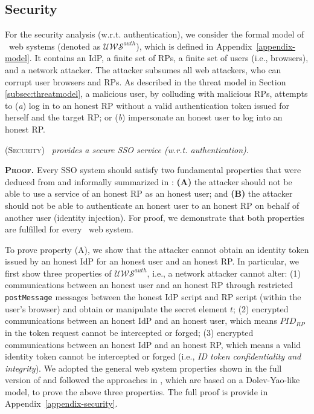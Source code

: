 \subsection{Security}
\label{analysis-security}

\newc
For the security analysis (w.r.t. authentication), we consider the formal model of \usso\ web systems (denoted as $\mathcal{U\!W\!S}^{auth}$), which is defined in Appendix~\ref{appendix-model}. It contains an IdP, a finite set of RPs, a finite set of users (i.e., browsers), and a network attacker. The attacker subsumes all web attackers, who can corrupt user browsers and RPs. As described in the threat model in Section \ref{subsec:threatmodel}, a malicious user, by colluding with malicious RPs, attempts to (\emph{a}) log in to an honest RP without a valid authentication token issued for herself and the target RP; or (\emph{b}) impersonate an honest user to log into an honest RP.



\begin{thm}
\textsc{(Security)} \emph{\usso\ provides a secure SSO service (w.r.t. authentication)}.
\end{thm}

\noindent\textbf{\textsc{Proof.}} Every SSO system should satisfy two fundamental properties that were deduced from \cite{FettKS14} and informally summarized in \cite{BrowserID,SPRESSO}: {\bf (A)} the attacker should not be able to use a service of an
honest RP as an honest user; and {\bf (B)} the attacker should not be able to authenticate an honest user to an honest RP on behalf of another user (identity injection). For proof, we demonstrate that both properties are fulfilled for every \usso\ web system. 

To prove property (A), we show that the attacker cannot obtain an identity token issued by an honest IdP for an honest user and an honest RP. In particular, we first show three properties of $\mathcal{U\!W\!S}^{auth}$, i.e., a network attacker cannot alter: (1) communications between an honest user and an honest RP through restricted \verb+postMessage+ messages between the honest IdP script and RP script (within the user's browser) and obtain or manipulate the secret element $t$; (2) encrypted communications between an honest IdP and an honest user, which means $PID_{RP}$ in the token request cannot be intercepted or forged; (3) encrypted communications between an honest IdP and an honest RP, which means a valid identity token cannot be intercepted or forged (i.e., {\em ID token confidentiality and integrity}). We adopted the general web system properties shown in the full version of \cite{FettKS14} and followed the approaches in \cite{BrowserID,SPRESSO}, which are based on a Dolev-Yao-like model, to prove the above three properties. The full proof is provide in Appendix~\ref{appendix-security}.

